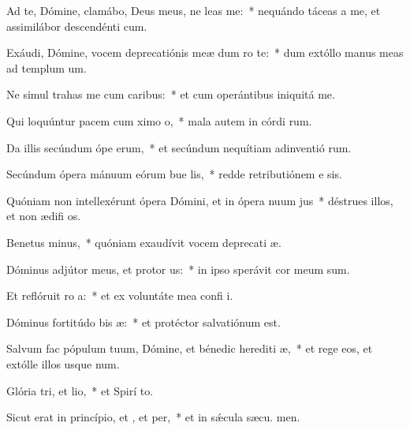 \item Ad te, Dómine, clamábo, Deus meus, ne leas  me:~* nequándo táceas a me, et assimilábor descendénti  cum.
\item Exáudi, Dómine, vocem deprecatiónis meæ dum ro  te:~* dum extóllo manus meas ad templum  um.
\item Ne simul trahas me cum caribus:~* et cum operántibus iniquitá   me.
\item Qui loquúntur pacem cum ximo o,~* mala autem in córdi rum.
\item Da illis secúndum ópe erum,~* et secúndum nequítiam adinventió rum.
\item Secúndum ópera mánuum eórum bue lis,~* redde retributiónem e sis.
\item Quóniam non intellexérunt ópera Dómini, et in ópera nuum jus~* déstrues illos, et non ædifi os.
\item Benetus minus,~* quóniam exaudívit vocem deprecati æ.
\item Dóminus adjútor meus, et protor us:~* in ipso sperávit cor meum   sum.
\item Et reflóruit ro a:~* et ex voluntáte mea confi i.
\item Dóminus fortitúdo bis æ:~* et protéctor salvatiónum   est.
\item Salvum fac pópulum tuum, Dómine, et bénedic herediti æ,~* et rege eos, et extólle illos usque  num.
\item Glória tri, et lio,~* et Spirí to.
\item Sicut erat in princípio, et , et per,~* et in sǽcula sæcu. men.
